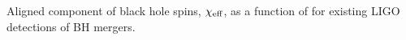  \label{fig:BHspin} Aligned component of black hole spins, $\chi_{\rm eff}$, as a function of for existing LIGO detections of BH mergers.